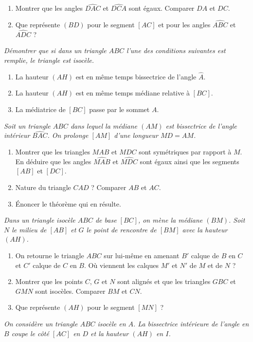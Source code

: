 \begin{itemize}
\begin{enumerate}
\item Montrer que les angles $\widehat{DAC}$ et $\widehat{DCA}$ sont égaux. Comparer $DA$ et $DC$.
\item Que représente $(BD)$ pour le segment $[AC]$ et pour les angles $\widehat{ABC}$ et $\widehat{ADC}$ ?
\end{enumerate}
\it Démontrer que si dans un triangle $ABC$ l'une des conditions suivantes est remplie, le triangle est isocèle. \begin{enumerate}
\item La hauteur $(AH)$ est en même temps bissectrice de l'angle $\widehat{A}$.
\item La hauteur $(AH)$ est en même temps médiane relative à $[BC]$. 
\item La médiatrice de $[BC]$ passe par le sommet $A$.
\end{enumerate}
\it Soit un triangle $ABC$ dans lequel la médiane $(AM)$ est bissectrice de l'angle intérieur $\widehat{BAC}$. On prolonge $[AM]$ d'une longueur $MD=AM$.\begin{enumerate}
\item Montrer que les triangles $MAB$ et $MDC$ sont symétriques par rapport à $M$. En déduire que les angles $\widehat{MAB}$ et $\widehat{MDC}$ sont égaux ainsi que les segments $[AB]$ et $[DC]$. 
\item Nature du triangle $CAD$ ? Comparer $AB$ et $AC$.
\item Énoncer le théorème qui en résulte.
\end{enumerate}
\it Dans un triangle isocèle $ABC$ de base $[BC]$, on mène la médiane $(BM)$. Soit $N$ le milieu de $[AB]$ et $G$ le point de rencontre de $[BM]$ avec la hauteur $(AH)$.\begin{enumerate}
\item On retourne le triangle $ABC$ sur lui-même en amenant $B'$ calque de $B$ en $C$ et $C'$ calque de $C$ en $B$. Où viennent les calques $M'$ et $N'$ de $M$ et de $N$ ? 
\item Montrer que les points $C$, $G$ et $N$ sont alignés et que les triangles $GBC$ et $GMN$ sont isocèles. Comparer $BM$ et $CN$. 
\item Que représente $(AH)$ pour le segment $[MN]$ ?
\end{enumerate}
\it On considère un triangle $ABC$ isocèle en $A$. La bissectrice intérieure de l'angle en $B$ coupe le côté $[AC]$ en $D$ et la hauteur $(AH)$ en $I$. \begin{enumerate}

\end{enumerate}
\end{itemize}
